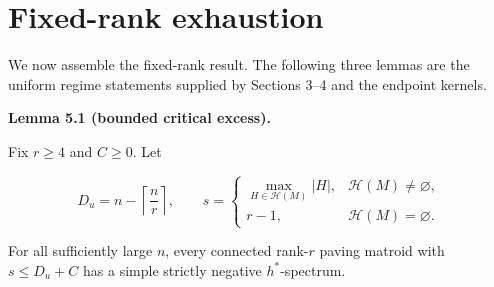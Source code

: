\documentclass[10pt]{article}
\newenvironment{mdstatement}[1]
  {\par\Needspace{0.16\textheight}\noindent\textbf{#1.}\ \itshape}
  {\par\normalfont}
\begin{document}
\section{Fixed-rank exhaustion}


We now assemble the fixed-rank result.  The following three lemmas are the
uniform regime statements supplied by Sections 3--4 and the endpoint kernels.

\begin{mdstatement}{Lemma 5.1 (bounded critical excess)}


Fix $r\ge4$ and $C\ge0$.  Let

\[
 D_u=n-\left\lceil\frac nr\right\rceil,
 \qquad
 s=\begin{cases}
 \max_{H\in\mathcal H(M)}|H|,&\mathcal H(M)\ne\varnothing,\\
 r-1,&\mathcal H(M)=\varnothing.
 \end{cases}
\]

For all sufficiently large $n$, every connected rank-$r$ paving matroid
with $s\le D_u+C$ has a simple strictly negative $h^*$-spectrum.

\end{mdstatement}
\end{document}
